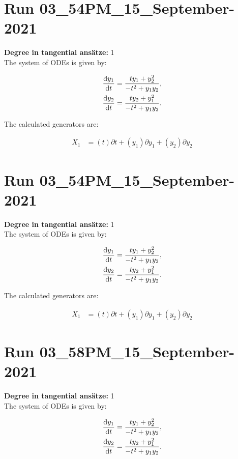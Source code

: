 \section*{Run 03\_54PM\_15\_September-2021}
\textbf{Degree in tangential ansätze:}	1\\
The system of ODEs is given by:

\begin{align*}
\dv{y_{1}}{t}&=\frac{t y_{1} + y_{2}^{2}}{- t^{2} + y_{1} y_{2}},\\
\dv{y_{2}}{t}&=\frac{t y_{2} + y_{1}^{2}}{- t^{2} + y_{1} y_{2}}.\\
\end{align*}

\noindent The calculated generators are:

\begin{align*}
X_{1}&=\left( t \right)\partial t+\left( y_{1} \right)\partial y_{1}+\left( y_{2} \right)\partial y_{2}\end{align*}
\section*{Run 03\_54PM\_15\_September-2021}
\textbf{Degree in tangential ansätze:}	1\\
The system of ODEs is given by:

\begin{align*}
\dv{y_{1}}{t}&=\frac{t y_{1} + y_{2}^{2}}{- t^{2} + y_{1} y_{2}},\\
\dv{y_{2}}{t}&=\frac{t y_{2} + y_{1}^{2}}{- t^{2} + y_{1} y_{2}}.\\
\end{align*}

\noindent The calculated generators are:

\begin{align*}
X_{1}&=\left( t \right)\partial t+\left( y_{1} \right)\partial y_{1}+\left( y_{2} \right)\partial y_{2}\end{align*}
\section*{Run 03\_58PM\_15\_September-2021}
\textbf{Degree in tangential ansätze:}	1\\
The system of ODEs is given by:

\begin{align*}
\dv{y_{1}}{t}&=\frac{t y_{1} + y_{2}^{2}}{- t^{2} + y_{1} y_{2}},\\
\dv{y_{2}}{t}&=\frac{t y_{2} + y_{1}^{2}}{- t^{2} + y_{1} y_{2}}.\\
\end{align*}

